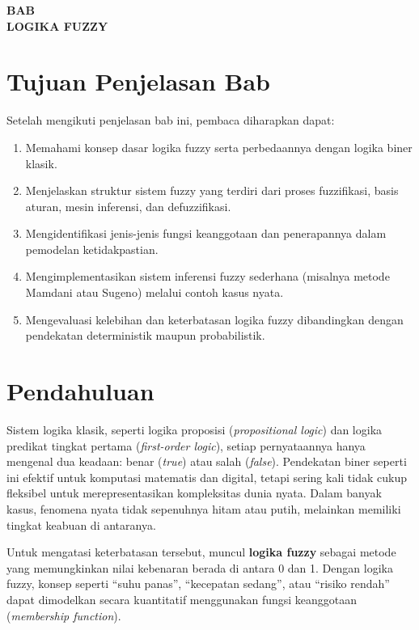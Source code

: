 \documentclass[12pt,a4paper]{article}
\theoremstyle{remark}
\begin{document}
\begin{center}
    \Large \textbf{BAB}\\[1em]
    \large \textbf{LOGIKA FUZZY}\\[2em]
\end{center}

\section{Tujuan Penjelasan Bab}
Setelah mengikuti penjelasan bab ini, pembaca diharapkan dapat:
\begin{enumerate}
    \item Memahami konsep dasar logika fuzzy serta perbedaannya dengan logika biner klasik.
    \item Menjelaskan struktur sistem fuzzy yang terdiri dari proses fuzzifikasi, basis aturan, mesin inferensi, dan defuzzifikasi.
    \item Mengidentifikasi jenis-jenis fungsi keanggotaan dan penerapannya dalam pemodelan ketidakpastian.
    \item Mengimplementasikan sistem inferensi fuzzy sederhana (misalnya metode Mamdani atau Sugeno) melalui contoh kasus nyata.
    \item Mengevaluasi kelebihan dan keterbatasan logika fuzzy dibandingkan dengan pendekatan deterministik maupun probabilistik.
\end{enumerate}


\section{Pendahuluan}

Sistem logika klasik, seperti logika proposisi (\textit{propositional logic}) dan logika predikat tingkat pertama (\textit{first-order logic}), setiap pernyataannya hanya mengenal dua keadaan: benar (\textit{true}) atau salah (\textit{false}). Pendekatan biner seperti ini efektif untuk komputasi matematis dan digital,
tetapi sering kali tidak cukup fleksibel untuk merepresentasikan kompleksitas dunia nyata.
Dalam banyak kasus, fenomena nyata tidak sepenuhnya hitam atau putih,
melainkan memiliki tingkat keabuan di antaranya.

Untuk mengatasi keterbatasan tersebut, muncul \textbf{logika fuzzy}
sebagai metode yang memungkinkan nilai kebenaran berada di antara 0 dan 1.
Dengan logika fuzzy, konsep seperti “suhu panas”, “kecepatan sedang”,
atau “risiko rendah” dapat dimodelkan secara kuantitatif menggunakan
fungsi keanggotaan (\textit{membership function}).
\end{document}
